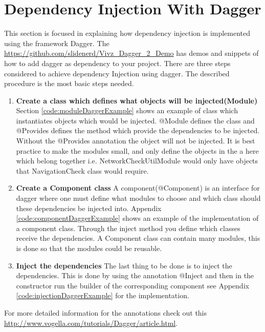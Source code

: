 \newpage
\section{Dependency Injection With Dagger}
    \label{sec:daggerDIImplementation}
    This section is focused in explaining how dependency injection is implemented
    using the framework Dagger.
    The \url{https://github.com/slidenerd/Vivz_Dagger_2_Demo} has demos and snippets
    of how to add dagger as dependency to your project. There are three steps considered
    to achieve dependency Injection using dagger. The described procedure is the most
    basic steps needed. 
    \begin{enumerate}
        \item 
            \textbf{Create a class which defines what objects will be injected(Module)}
                Section \ref{code:moduleDaggerExample} shows an example of class which instantiates 
                objects which would be injected. @Module defines the class and @Provides
                defines the method which provide the dependencies to be injected. Without the
                @Provides annotation the object will not be injected. 
                It is best practice to make the modules small, and only define 
                the objects in the a here 
                which belong together i.e. NetworkCheckUtilModule would only have
                objects that NavigationCheck class would require.  
        \item 
            \textbf{Create a Component class}
                A component(@Component) is an interface for dagger where one  must define 
                what modules to choose and which class should these dependencies be injected into. 
                Appendix \ref{code:componentDaggerExample} shows an example of the implementation of a 
                component class.
                Through the inject method you define
                which classes receive the dependencies. A Component class can contain 
                many modules, this is done so that the modules could be reusable. 
        \item 
            \textbf{Inject the dependencies}
                The last thing to be done is to inject the dependencies. This is done by
                using the annotation @Inject and then in the constructor run the builder
                of the corresponding component see Appendix \ref{code:injectionDaggerExample} for the
                implementation. 
    \end{enumerate}
    For more detailed information for the annotations check out
    this \url{http://www.vogella.com/tutorials/Dagger/article.html}.